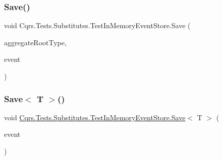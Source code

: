 \mbox{\label{classCqrs_1_1Tests_1_1Substitutes_1_1TestInMemoryEventStore_ad55933a4b148cef3d59c5552038af878}} 
\subsubsection{\texorpdfstring{Save()}{Save()}}
{\footnotesize\ttfamily void Cqrs.\+Tests.\+Substitutes.\+Test\+In\+Memory\+Event\+Store.\+Save (\begin{DoxyParamCaption}\item[{Type}]{aggregate\+Root\+Type,  }\item[{\hyperlink{interfaceCqrs_1_1Events_1_1IEvent}{I\+Event}$<$ \hyperlink{interfaceCqrs_1_1Authentication_1_1ISingleSignOnToken}{I\+Single\+Sign\+On\+Token} $>$ @}]{event }\end{DoxyParamCaption})}

\mbox{\label{classCqrs_1_1Tests_1_1Substitutes_1_1TestInMemoryEventStore_ac5d70085f30ac4c8be0790bc14de90d3}} 
\subsubsection{\texorpdfstring{Save$<$ T $>$()}{Save< T >()}}
{\footnotesize\ttfamily void \hyperlink{classCqrs_1_1Tests_1_1Substitutes_1_1TestInMemoryEventStore_ad55933a4b148cef3d59c5552038af878}{Cqrs.\+Tests.\+Substitutes.\+Test\+In\+Memory\+Event\+Store.\+Save}$<$ T $>$ (\begin{DoxyParamCaption}\item[{\hyperlink{interfaceCqrs_1_1Events_1_1IEvent}{I\+Event}$<$ \hyperlink{interfaceCqrs_1_1Authentication_1_1ISingleSignOnToken}{I\+Single\+Sign\+On\+Token} $>$ @}]{event }\end{DoxyParamCaption})}



